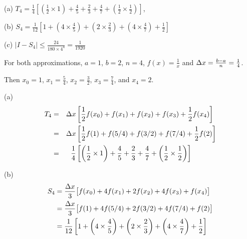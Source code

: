 \begin{answer}
(a)  $\displaystyle T_4
=\frac{1}{4}\left[\left(\frac{1}{2}\times 1\right)+\frac{4}{5}+\frac{2}{3}+ \frac{4}{7}+\left(\frac{1}{2}\times\frac{1}{2}\right)\right]$,

\noindent
(b) $\displaystyle S_4
=\frac{1}{12}\left[1+\left(4\times\frac{4}{5}\right)+\left(2\times \frac{2}{3}\right)+\left(4\times \frac{4}{7}\right)+\frac{1}{2}\right]$

\noindent
(c) $\displaystyle\Big|I -S_4\Big|
                \le \frac{24}{180\times 4^4}=\frac{1}{1920}$

\end{answer}

\begin{solution}
For both approximations, $a=1$, $b=2$, $n=4$, $f(x)=\frac{1}{x}$ and $\Delta x=\frac{b-a}{n}=\frac{1}{4}$.

Then $x_0 = 1$, $x_1=\frac{5}{4}$, $x_2 = \frac{3}{2}$, $x_3=\frac{7}{4}$, and $x_4=2$.


  \begin{center}
  \end{center}



\noindent (a)
\begin{alignat*}{3}
T_4&=&\Delta x&\left[\frac{1}{2}f(x_0)+f(x_1)+f(x_2)+f(x_3)+\frac{1}{2}f(x_4)\right]\\
&=&\Delta x&\left[\frac{1}{2}f(1)+f(5/4)+f(3/2)+f(7/4)+\frac{1}{2}f(2)\right]\\
&=&\frac{1}{4}&\left[\left(\frac{1}{2}\times 1\right)+\frac{4}{5}+\frac{2}{3}+ \frac{4}{7}+\left(\frac{1}{2}\times\frac{1}{2}\right)\right]
\end{alignat*}

\noindent (b)
\begin{align*}
S_4&=\frac{\Delta x}{3}\big[f(x_0)+4f(x_1)+2f(x_2)+4f(x_3)+f(x_4)\big]\\
&=\frac{\Delta x}{3}\big[f(1)+4f(5/4)+2f(3/2)+4f(7/4)+f(2)\big]\\
&=\frac{1}{12}\left[1+\left(4\times\frac{4}{5}\right)+\left(2\times \frac{2}{3}\right)+\left(4\times \frac{4}{7}\right)+\frac{1}{2}\right]
\end{align*}


\end{solution}
